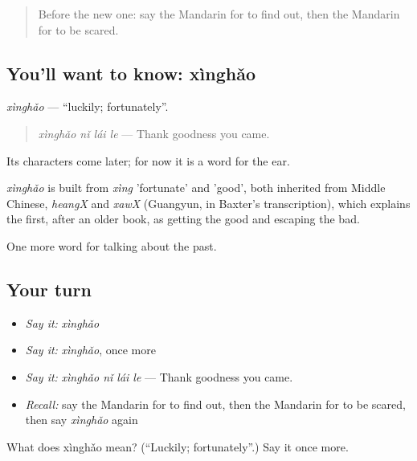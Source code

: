 \label{lesson:ZH-C236-xinghao}



\begin{quote}
Before the new one: say the Mandarin for to find out, then the Mandarin for to be scared.
\end{quote}

\subsection*{You'll want to know: xìnghǎo}
\emph{xìnghǎo} — \textquotedblleft{}luckily; fortunately\textquotedblright{}.

\begin{quote}
\emph{xìnghǎo nǐ lái le} — Thank goodness you came.
\end{quote}

Its characters come later; for now it is a word for the ear.

\begin{cousinweb}
\emph{xìnghǎo} is built from \emph{xìng} 'fortunate' and  'good', both inherited from Middle Chinese, \emph{heangX} and \emph{xawX} (Guangyun, in Baxter's transcription), which explains the first, after an older book, as getting the good and escaping the bad.
\end{cousinweb}

\begin{grammarlens}[title={What you've built}]
One more word for talking about the past.
\end{grammarlens}

\subsection*{Your turn}
\begin{itemize}
\raggedright
  \item \emph{Say it:} \emph{xìnghǎo}
  \item \emph{Say it:} \emph{xìnghǎo}, once more
  \item \emph{Say it:} \emph{xìnghǎo nǐ lái le} — Thank goodness you came.
  \item \emph{Recall:} say the Mandarin for to find out, then the Mandarin for to be scared, then say \emph{xìnghǎo} again
\end{itemize}

\begin{tcolorbox}[breakable,colback=teal!4,colframe=teal!35!black,title={Before you move on}]
What does xìnghǎo mean? (\textquotedblleft{}Luckily; fortunately\textquotedblright{}.) Say it once more.
\end{tcolorbox}
